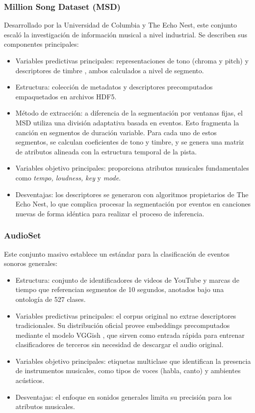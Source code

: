 \subsubsection{Million Song Dataset (MSD)}
Desarrollado por la Universidad de Columbia y The Echo Nest, este conjunto escaló la investigación de información musical a nivel industrial. Se describen sus componentes principales:
\begin{itemize}
    \item Variables predictivas principales: representaciones de tono (chroma y pitch) \citep{gomez2006tonal, muller2015fundamentals} y descriptores de timbre \citep{peeters2004large}, ambos calculados a nivel de segmento.
    \item Estructura: colección de metadatos y descriptores precomputados empaquetados en archivos HDF5.
    \item Método de extracción: a diferencia de la segmentación por ventanas fijas, el MSD utiliza una división adaptativa basada en eventos. Esto fragmenta la canción en segmentos de duración variable. Para cada uno de estos segmentos, se calculan coeficientes de tono y timbre, y se genera una matriz de atributos alineada con la estructura temporal de la pista.
    \item Variables objetivo principales: proporciona atributos musicales fundamentales como \textit{tempo, loudness, key} y \textit{mode}.
    \item Desventajas: los descriptores se generaron con algoritmos propietarios de The Echo Nest, lo que complica procesar la segmentación por eventos en canciones nuevas de forma idéntica para realizar el proceso de inferencia.
\end{itemize}

\subsubsection{AudioSet}
Este conjunto masivo establece un estándar para la clasificación de eventos sonoros generales:
\begin{itemize}
    \item Estructura: conjunto de identificadores de videos de YouTube y marcas de tiempo que referencian segmentos de 10 segundos, anotados bajo una ontología de 527 clases.
    \item Variables predictivas principales: el corpus original no extrae descriptores tradicionales. Su distribución oficial provee embeddings precomputados mediante el modelo VGGish \cite{hershey2017cnn}, que sirven como entrada rápida para entrenar clasificadores de terceros sin necesidad de descargar el audio original.
    \item Variables objetivo principales: etiquetas multiclase que identifican la presencia de instrumentos musicales, como tipos de voces (habla, canto) y ambientes acústicos.
    \item Desventajas: el enfoque en sonidos generales limita su precisión para los atributos musicales.
\end{itemize}

